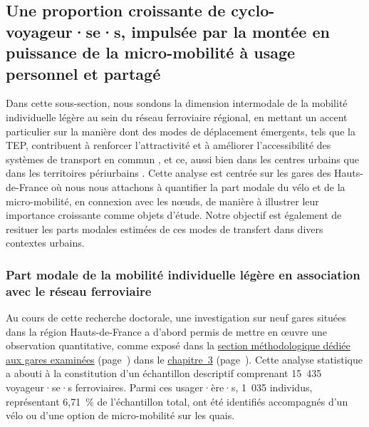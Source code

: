 \begin{refsegment}
\subsection{Une proportion croissante de cyclo-voyageur·se·s, impulsée par la montée en puissance de la micro-mobilité à usage personnel et partagé
    \label{chap4:proportion-croissante-voyageurs-intermodaux}
    }

Dans cette sous-section, nous sondons la dimension intermodale de la mobilité individuelle légère au sein du réseau ferroviaire régional, en mettant un accent particulier sur la manière dont des modes de déplacement émergents, tels que la \acrfull{TEP}, contribuent à renforcer l'attractivité et à améliorer l'accessibilité des systèmes de transport en commun \textcolor{blue}{\autocite[45]{corporate_partnership_board_good_2020}}, et ce, aussi bien dans les centres urbains que dans les territoires périurbains \textcolor{blue}{\autocite[38]{stransky_periurbain_2019}}. Cette analyse est centrée sur les gares des Hauts-de-France où nous nous attachons à quantifier la part modale du vélo et de la micro-mobilité, en connexion avec les nœuds, de manière à illustrer leur importance croissante comme objets d'étude. Notre objectif est également de resituer les parts modales estimées de ces modes de transfert dans divers contextes urbains.%

\subsubsection*{Part modale de la mobilité individuelle légère en association avec le réseau ferroviaire
    \label{chap4:part-modale-velo-micromobilite}
    }

Au cours de cette recherche doctorale, une investigation sur neuf gares situées dans la région Hauts-de-France a d'abord permis de mettre en œuvre une observation quantitative, comme exposé dans la \hyperref[chap3:observation-quantitative-gares-examinees]{section méthodologique dédiée aux gares examinées} (page~\pageref{chap3:observation-quantitative-gares-examinees}) dans le \hyperref[chap3:titre]{chapitre~3} (page~\pageref{chap3:titre}). Cette analyse statistique a abouti à la constitution d'un échantillon descriptif comprenant 15~435 voyageur·se·s ferroviaires. Parmi ces usager·ère·s, 1~035 individus, représentant 6,71~\% de l'échantillon total, ont été identifiés accompagnés d'un vélo ou d'une option de micro-mobilité sur les quais.%


\end{refsegment}

